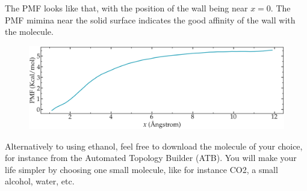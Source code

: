 The PMF looks like that, with the position of the wall being near $x=0$.
The PMF mimina near the solid surface indicates the good affinity of the wall with 
the molecule.

\begin{figure}
\includegraphics[width=\linewidth]{tutorials/level3/free-energy-calculation/exercice-ethanol-light.png}
\end{figure}

Alternatively to using ethanol, feel free to download the molecule of your choice, for 
instance from the  Automated Topology Builder (ATB). You will make your life simpler
by choosing one small molecule, like for instance CO2, a small alcohol, water, etc.

